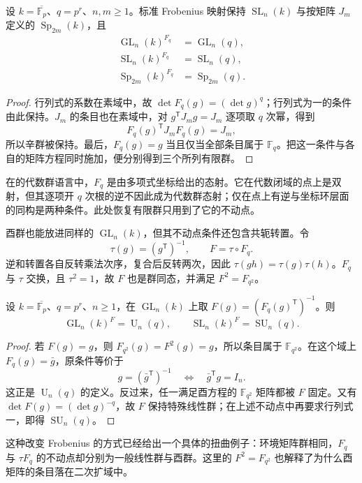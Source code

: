 \begin{proposition}\label{b5:prop:F-split-fixed-points}
	设 \(k=\overline{\mathbb F_p}\)、\(q=p^r\)、\(n,m\ge1\)。标准 Frobenius 映射保持 \(\operatorname{SL}_n(k)\) 与按矩阵 \(J_m\) 定义的 \(\operatorname{Sp}_{2m}(k)\)，且
	\[
		\begin{aligned}
			\operatorname{GL}_n(k)^{F_q}&=\operatorname{GL}_n(q),\\
			\operatorname{SL}_n(k)^{F_q}&=\operatorname{SL}_n(q),\\
			\operatorname{Sp}_{2m}(k)^{F_q}&=\operatorname{Sp}_{2m}(q).
		\end{aligned}
	\]
\end{proposition}
\begin{proof}
	行列式的系数在素域中，故 \(\det F_q(g)=(\det g)^q\)；行列式为一的条件由此保持。\(J_m\) 的条目也在素域中，对 \(g^{\mathsf T}J_mg=J_m\) 逐项取 \(q\) 次幂，得到
	\[
		F_q(g)^{\mathsf T}J_mF_q(g)=J_m,
	\]
	所以辛群被保持。最后，\(F_q(g)=g\) 当且仅当全部条目属于 \(\mathbb F_q\)。把这一条件与各自的矩阵方程同时施加，便分别得到三个所列有限群。
\end{proof}
在的代数群语言中，\(F_q\) 是由多项式坐标给出的态射。它在代数闭域的点上是双射，但其逐项开 \(q\) 次根的逆不因此成为代数群态射；仅在点上有逆与坐标环层面的同构是两种条件。此处恢复有限群只用到了它的不动点。

\ProseParagraphBreak

酉群也能放进同样的 \(\operatorname{GL}_n(k)\)，但其不动点条件还包含共轭转置。令
\[
	\tau(g)=(g^{\mathsf T})^{-1},\qquad F=\tau\circ F_q.
\]
逆和转置各自反转乘法次序，复合后反转两次，因此 \(\tau(gh)=\tau(g)\tau(h)\)。\(F_q\) 与 \(\tau\) 交换，且 \(\tau^2=1\)，故 \(F\) 也是群同态，并满足 \(F^2=F_{q^2}\)。

\begin{proposition}\label{b5:prop:F-unitary-fixed-points}
	设 \(k=\overline{\mathbb F_p}\)、\(q=p^r\)、\(n\ge1\)，在 \(\operatorname{GL}_n(k)\) 上取 \(F(g)=(F_q(g)^{\mathsf T})^{-1}\)。则
	\[
		\operatorname{GL}_n(k)^F=\operatorname U_n(q),\qquad
		\operatorname{SL}_n(k)^F=\operatorname{SU}_n(q).
	\]
\end{proposition}
\begin{proof}
	若 \(F(g)=g\)，则 \(F_{q^2}(g)=F^2(g)=g\)，所以条目属于 \(\mathbb F_{q^2}\)。在这个域上 \(F_q(g)=\bar g\)，原条件等价于
	\[
		g=(\bar g^{\mathsf T})^{-1}
		\quad\Longleftrightarrow\quad
		\bar g^{\mathsf T}g=I_n.
	\]
	这正是 \(\operatorname U_n(q)\) 的定义。反过来，任一满足酉方程的 \(\mathbb F_{q^2}\) 矩阵都被 \(F\) 固定。又有 \(\det F(g)=(\det g)^{-q}\)，故 \(F\) 保持特殊线性群；在上述不动点中再要求行列式一，即得 \(\operatorname{SU}_n(q)\)。
\end{proof}
这种改变 Frobenius 的方式已经给出一个具体的扭曲例子：环境矩阵群相同，\(F_q\) 与 \(\tau F_q\) 的不动点却分别为一般线性群与酉群。这里的 \(F^2=F_{q^2}\) 也解释了为什么酉矩阵的条目落在二次扩域中。

